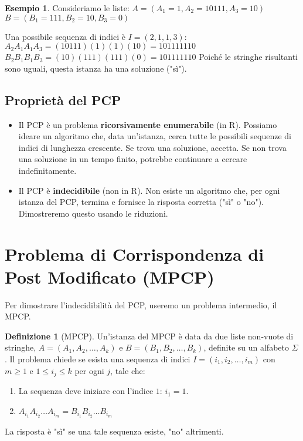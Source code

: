 \documentclass[a4paper]{article}
\theoremstyle{definition} %
\newtheorem{definition}{Definizione}
\newtheorem{example}{Esempio}
\theoremstyle{remark} %
\begin{document}
\begin{example}
Consideriamo le liste:
$A = (A_1 = 1, A_2 = 10111, A_3 = 10)$
$B = (B_1 = 111, B_2 = 10, B_3 = 0)$

Una possibile sequenza di indici è $I = (2, 1, 1, 3)$:
$A_2 A_1 A_1 A_3 = (10111)(1)(1)(10) = 101111110$
$B_2 B_1 B_1 B_3 = (10)(111)(111)(0) = 101111110$
Poiché le stringhe risultanti sono uguali, questa istanza ha una soluzione ("sì").
\end{example}

\subsection{Proprietà del PCP}
\begin{itemize}
    \item Il PCP è un problema \textbf{ricorsivamente enumerabile} (in R). Possiamo ideare un algoritmo che, data un'istanza, cerca tutte le possibili sequenze di indici di lunghezza crescente. Se trova una soluzione, accetta. Se non trova una soluzione in un tempo finito, potrebbe continuare a cercare indefinitamente.
    \item Il PCP è \textbf{indecidibile} (non in R). Non esiste un algoritmo che, per ogni istanza del PCP, termina e fornisce la risposta corretta ("sì" o "no"). Dimostreremo questo usando le riduzioni.
\end{itemize}

\section{Problema di Corrispondenza di Post Modificato (MPCP)}

Per dimostrare l'indecidibilità del PCP, useremo un problema intermedio, il MPCP.

\begin{definition}[MPCP]
Un'istanza del MPCP è data da due liste non-vuote di stringhe, $A = (A_1, A_2, \dots, A_k)$ e $B = (B_1, B_2, \dots, B_k)$, definite su un alfabeto $\Sigma$.
Il problema chiede se esista una sequenza di indici $I = (i_1, i_2, \dots, i_m)$ con $m \ge 1$ e $1 \le i_j \le k$ per ogni $j$, tale che:
\begin{enumerate}
    \item La sequenza deve iniziare con l'indice $1$: $i_1 = 1$.
    \item $A_{i_1} A_{i_2} \dots A_{i_m} = B_{i_1} B_{i_2} \dots B_{i_m}$
\end{enumerate}
La risposta è "sì" se una tale sequenza esiste, "no" altrimenti.
\end{definition}
\end{document}
